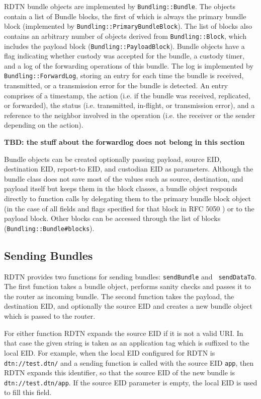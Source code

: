 \documentclass{article}
\begin{document}
RDTN bundle objects are implemented by {\tt Bundling::Bundle}. The objects
contain a list of Bundle blocks, the first of which is always the primary bundle
block (implemented by {\tt Bundling::PrimaryBundleBlock}). The list of blocks
also contains an arbitrary number of objects derived from {\tt Bundling::Block},
which includes the payload block ({\tt Bundling::PayloadBlock}). Bundle objects
have a flag indicating whether custody was accepted for the bundle, a custody
timer, and a log of the forwarding operations of this bundle. The log is
implemented by {\tt Bundling::ForwardLog}, storing an entry for each time the
bundle is received, transmitted, or a transmission error for the bundle is
detected. An entry comprises of a timestamp, the action (i.e. if the bundle was
received, replicated, or forwarded), the status (i.e. transmitted, in-flight, or
transmission error), and a reference to the neighbor involved in the operation
(i.e. the receiver or the sender depending on the action).

{\bf TBD: the stuff about the forwardlog does not belong in this section}

Bundle objects can be created optionally passing payload, source EID,
destination EID, report-to EID, and custodian EID as parameters. Although the
bundle class does not save most of the values such as source, destination, and
payload itself but keeps them in the block classes, a bundle object responds
directly to function calls by delegating them to the primary bundle block object
(in the case of all fields and flags specified for that block in RFC 5050
\cite{bundle-spec}) or to the payload block. Other blocks can be accessed
through the list of blocks ({\tt Bundling::Bundle\#blocks}).

\subsection{Sending Bundles}\label{sec.sending}

RDTN provides two functions for sending bundles: {\tt sendBundle} and {\tt
sendDataTo}. The first function takes a bundle object, performs sanity checks
and passes it to the router as incoming bundle. The second function takes the
payload, the destination EID, and optionally the source EID and creates a new
bundle object which is passed to the router.

For either function RDTN expands the source EID if it is not a valid URI. In
that case the given string is taken as an application tag which is suffixed to
the local EID. For example, when the local EID configured for RDTN is {\tt
dtn://test.dtn/} and a sending function is called with the source EID {\tt app},
then RDTN expands this identifier, so that the source EID of the new bundle is
{\tt dtn://test.dtn/app}. If the source EID parameter is empty, the local EID is
used to fill this field.
\end{document}
